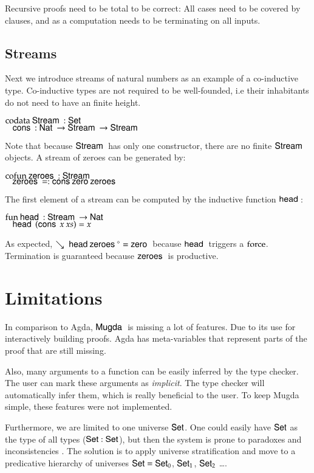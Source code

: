 Recursive proofs need to be total to be correct:
All cases need to be covered by clauses, and as a computation needs to be terminating on all inputs.
\subsection{Streams}
Next we introduce streams of natural numbers as an example of a co-inductive type.
Co-inductive types are not required to be well-founded, i.e their inhabitants do not need to have an finite height.
\begin{bsp}
$\mathrm{codata}\: \mathsf{Stream}\: : \mathsf{Set} $ \\
$\hspace*{3mm} \mathsf{cons}\: : \mathsf{Nat}\: \rightarrow \mathsf{Stream}\: \rightarrow \mathsf{Stream}\: $
\end{bsp}
Note that because $\mathsf{Stream}\:$ has only one constructor, there are no finite $\mathsf{Stream}\:$ objects.
A stream of zeroes can be generated by:
\begin{bsp}
$\mathrm{cofun}\: \mathsf{zeroes}\:: \mathsf{Stream}\: $ \\
$\hspace*{3mm} \mathsf{zeroes}\: = : \mathsf{cons}\: \mathsf{zero}\: \mathsf{zeroes}\:$
\end{bsp}

\noindent The first element of a stream can be computed by the inductive function $\mathsf{head}\:$:
\begin{bsp}
$\mathrm{fun}\: \mathsf{head}\: : \mathsf{Stream}\: \rightarrow \mathsf{Nat}\:$\\
$\hspace*{3mm} \mathsf{head}\: \: (\mathsf{cons}\: \: x \: xs) = x$
\end{bsp}

As expected, $\searrow\; {\mathsf{head}\: \mathsf{zeroes}\:^{\diamond}} = \mathsf{zero}\: $ because $\mathsf{head}\:$ triggers a $\operatorname{force}$. Termination is guaranteed because $\mathsf{zeroes}\:$ is productive.

\section{Limitations}
In comparison to Agda, $\textsf{Mugda }$ is missing a lot of features.
Due to its use for interactively building proofs. Agda has meta-variables that represent parts of the proof that are still missing. 

Also, many arguments to a function can be easily inferred by the type checker.
The user can mark these arguments as \emph{implicit}. The type checker will automatically infer them, which is really beneficial to the user.
To keep Mugda simple, these features were not implemented.

Furthermore, we are limited to one universe $\mathsf{Set}$.
One could easily have $\mathsf{Set}$ as the type of all types ($\mathsf{Set} : \mathsf{Set}$), but then the system is prone to paradoxes and inconsistencies \cite{coquand86analysis,coquand92pattern}.
The solution is to apply universe stratification and move to a predicative hierarchy of universes $ \mathsf{Set} = \mathsf{Set}_0$, $\mathsf{Set}_1$, $\mathsf{Set}_2$ \dots. 
